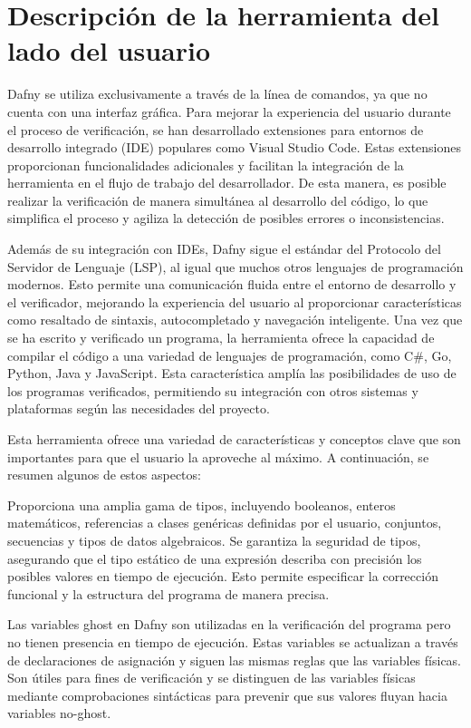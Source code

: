 \documentclass[runningheads]{llncs}
\begin{document}
\section{Descripción de la herramienta del lado del usuario}

Dafny se utiliza exclusivamente a través de la línea de comandos, ya que no cuenta con una interfaz gráfica.
Para mejorar la experiencia del usuario durante el proceso de verificación, se han desarrollado extensiones para entornos de desarrollo integrado (IDE) populares como Visual Studio Code.
Estas extensiones proporcionan funcionalidades adicionales y facilitan la integración de la herramienta en el flujo de trabajo del desarrollador.
De esta manera, es posible realizar la verificación de manera simultánea al desarrollo del código, lo que simplifica el proceso y agiliza la detección de posibles errores o inconsistencias.

Además de su integración con IDEs, Dafny sigue el estándar del Protocolo del Servidor de Lenguaje (LSP), al igual que muchos otros lenguajes de programación modernos.
Esto permite una comunicación fluida entre el entorno de desarrollo y el verificador, mejorando la experiencia del usuario al proporcionar características como resaltado de sintaxis, autocompletado y navegación inteligente.
Una vez que se ha escrito y verificado un programa, la herramienta ofrece la capacidad de compilar el código a una variedad de lenguajes de programación, como C\#, Go, Python, Java y JavaScript.
Esta característica amplía las posibilidades de uso de los programas verificados, permitiendo su integración con otros sistemas y plataformas según las necesidades del proyecto.

Esta herramienta ofrece una variedad de características y conceptos clave que son importantes para que el usuario la aproveche al máximo.
A continuación, se resumen algunos de estos aspectos:

Proporciona una amplia gama de tipos, incluyendo booleanos, enteros matemáticos, referencias a clases genéricas definidas por el usuario, conjuntos, secuencias y tipos de datos algebraicos.
Se garantiza la seguridad de tipos, asegurando que el tipo estático de una expresión describa con precisión los posibles valores en tiempo de ejecución.
Esto permite especificar la corrección funcional y la estructura del programa de manera precisa.

Las variables ghost en Dafny son utilizadas en la verificación del programa pero no tienen presencia en tiempo de ejecución.
Estas variables se actualizan a través de declaraciones de asignación y siguen las mismas reglas que las variables físicas.
Son útiles para fines de verificación y se distinguen de las variables físicas mediante comprobaciones sintácticas para prevenir que sus valores fluyan hacia variables no-ghost.
\end{document}
